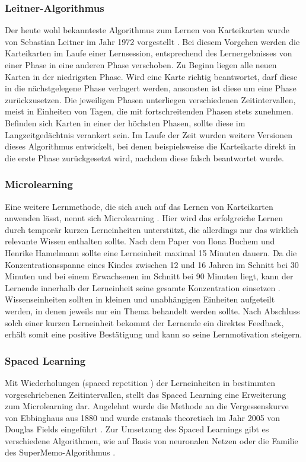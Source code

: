 \subsubsection{Leitner-Algorithmus}
Der heute wohl bekannteste Algorithmus zum Lernen von Karteikarten wurde von Sebastian Leitner im Jahr 1972 vorgestellt \cite{SebastianLeitner.1972}. Bei diesem Vorgehen werden die Karteikarten im Laufe einer Lernsession, entsprechend des Lernergebnisses von einer Phase in eine anderen Phase verschoben. Zu Beginn liegen alle neuen Karten in der niedrigsten Phase. Wird eine Karte richtig beantwortet, darf diese in die nächstgelegene Phase verlagert werden, ansonsten ist diese um eine Phase zurückzusetzen. Die jeweiligen Phasen unterliegen verschiedenen Zeitintervallen, meist in Einheiten von Tagen, die mit fortschreitenden Phasen stets zunehmen. Befinden sich Karten in einer der höchsten Phasen, sollte diese im Langzeitgedächtnis verankert sein. Im  Laufe der Zeit wurden weitere Versionen dieses Algorithmus entwickelt, bei denen beispielsweise die Karteikarte direkt in die erste Phase zurückgesetzt wird, nachdem diese falsch beantwortet wurde.

\subsubsection{Microlearning}
Eine weitere Lernmethode, die sich auch auf das Lernen von Karteikarten anwenden lässt, nennt sich Microlearning \cite{Hug.2005}. Hier wird das erfolgreiche Lernen durch temporär kurzen Lerneinheiten unterstützt, die allerdings nur das wirklich relevante Wissen enthalten sollte. Nach dem Paper von Ilona Buchem und Henrike Hamelmann \cite{Buchem.2010} sollte eine Lerneinheit maximal 15 Minuten dauern. Da die Konzentrationsspanne eines Kindes zwischen 12 und 16 Jahren im Schnitt bei 30 Minuten und bei einem Erwachsenen im Schnitt bei 90 Minuten liegt, kann der Lernende innerhalb der Lerneinheit seine gesamte Konzentration einsetzen \cite{konzentrationsspanne}. Wissenseinheiten sollten in kleinen und unabhängigen Einheiten aufgeteilt werden, in denen jeweils nur ein Thema behandelt werden sollte. Nach Abschluss solch einer kurzen Lerneinheit bekommt der Lernende ein direktes Feedback, erhält somit eine positive Bestätigung und kann so seine Lernmotivation steigern.


\subsubsection{Spaced Learning}
Mit Wiederholungen (\glqq spaced repetition \grqq{}) der Lerneinheiten in bestimmten vorgeschriebenen Zeitintervallen, stellt das Spaced Learning eine Erweiterung zum Microlearning dar. Angelehnt wurde die Methode an die Vergessenskurve von Ebbinghaus aus 1880 und wurde erstmals theoretisch im Jahr 2005 von Douglas Fields eingeführt \cite{Fields.2005}. Zur Umsetzung des Spaced Learnings gibt es verschiedene Algorithmen, wie auf Basis von neuronalen Netzen \cite{BartoszDregerPiotrWozniak.1998} oder die Familie des SuperMemo-Algorithmus \cite{supermemo}. 


